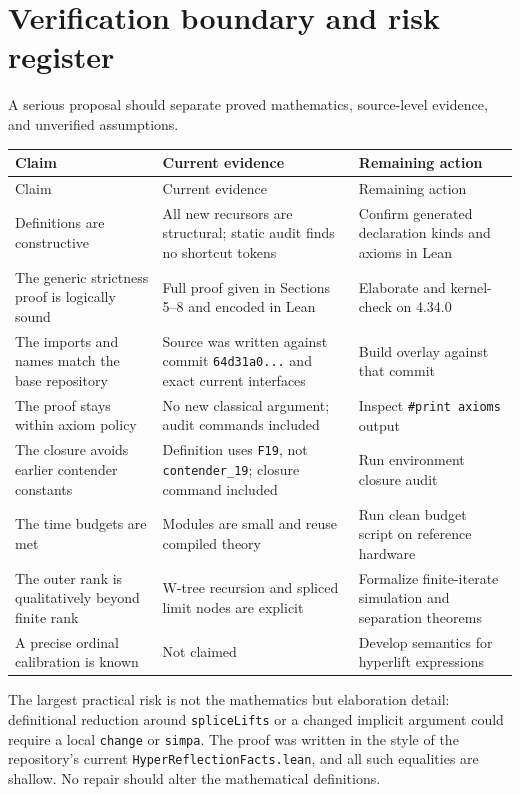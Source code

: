 \documentclass[11pt]{article}
\theoremstyle{definition}
\theoremstyle{remark}
\newcommand{\code}[1]{\texttt{#1}}
\begin{document}
\section{Verification boundary and risk register}

A serious proposal should separate proved mathematics, source-level evidence,
and unverified assumptions.

\begin{longtable}{P{0.25\textwidth}P{0.27\textwidth}P{0.39\textwidth}}
\toprule
Claim & Current evidence & Remaining action\\
\midrule
\endfirsthead
\toprule
Claim & Current evidence & Remaining action\\
\midrule
\endhead
Definitions are constructive & All new recursors are structural; static audit
finds no shortcut tokens & Confirm generated declaration kinds and axioms in Lean\\
The generic strictness proof is logically sound & Full proof given in
Sections 5--8 and encoded in Lean & Elaborate and kernel-check on 4.34.0\\
The imports and names match the base repository & Source was written against
commit \code{64d31a0...} and exact current interfaces & Build overlay against
that commit\\
The proof stays within axiom policy & No new classical argument; audit commands
included & Inspect \code{\#print axioms} output\\
The closure avoids earlier contender constants & Definition uses \code{F19},
not \code{contender\_19}; closure command included & Run environment closure audit\\
The time budgets are met & Modules are small and reuse compiled theory & Run
clean budget script on reference hardware\\
The outer rank is qualitatively beyond finite rank & W-tree recursion and
spliced limit nodes are explicit & Formalize finite-iterate simulation and
separation theorems\\
A precise ordinal calibration is known & Not claimed & Develop semantics for
hyperlift expressions\\
\bottomrule
\end{longtable}

The largest practical risk is not the mathematics but elaboration detail:
definitional reduction around \code{spliceLifts} or a changed implicit argument
could require a local \code{change} or \code{simpa}.  The proof was written in
the style of the repository's current \code{HyperReflectionFacts.lean}, and
all such equalities are shallow.  No repair should alter the mathematical
definitions.
\end{document}

